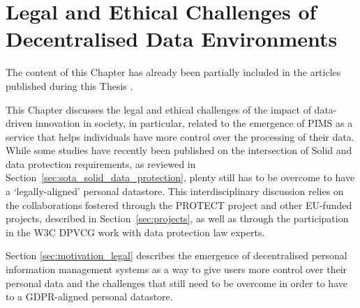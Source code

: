 \chapter{Legal and Ethical Challenges of Decentralised Data Environments}
\label{chap:legal}

\begin{tcolorbox}[colback=royallavender!40]
The content of this Chapter has already been partially included in the articles published during this Thesis \citep{esteves_fostering_2022,asgarinia_who_2023,florea_is_2023}.
\end{tcolorbox}

This Chapter discusses the legal and ethical challenges of the impact of data-driven innovation in society, in particular, related to the emergence of PIMS as a service that helps individuals have more control over the processing of their data.
While some studies have recently been published on the intersection of Solid and data protection requirements, as reviewed in Section~\ref{sec:sota_solid_data_protection}, plenty still has to be overcome to have a `legally-aligned' personal datastore.
This interdisciplinary discussion relies on the collaborations fostered through the PROTECT project and other EU-funded projects, described in Section~\ref{sec:projects}, as well as through the participation in the W3C DPVCG work with data protection law experts.

Section \ref{sec:motivation_legal} describes the emergence of decentralised personal information management systems as a way to give users more control over their personal data and the challenges that still need to be overcome in order to have to a GDPR-aligned personal datastore.


